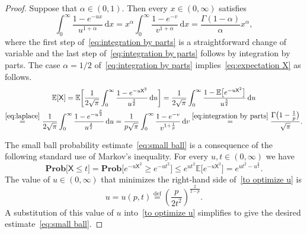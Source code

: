 \documentclass[11pt,reqno]{amsart}
\renewcommand{\le}{\leqslant}
\renewcommand{\ge}{\geqslant}
\newcommand{\ud}[0]{\,\mathrm{d}}
\theoremstyle{remark}
\newcommand{\E}{\mathbb{ E}}
\newcommand{\eqdef}{\stackrel{\mathrm{def}}{=}}
\renewcommand{\Pr}{\mathbf{Prob}}
\renewcommand{\1}{\mathbf 1}
\newcommand{\XX}{\mathsf{X}}
\begin{document}
\begin{proof}
Suppose that $\alpha\in (0,1)$. Then every $x\in (0,\infty)$ satisfies
\begin{equation}\label{eq:integration by parts}
\int_0^\infty \frac{1-e^{-ux}}{u^{1+\alpha}}\ud x =x^\alpha\int_0^\infty \frac{1-e^{-v}}{v^{1+\alpha}}\ud x= \frac{\Gamma(1-\alpha)}{\alpha}x^\alpha,
\end{equation}
where the first step of~\eqref{eq:integration by parts} is a straightforward change of variable and the last step of~\eqref{eq:integration by parts} follows by integration by parts.  The case $\alpha=1/2$ of~\eqref{eq:integration by parts} implies~\eqref{eq:expectation X} as follows.
\begin{multline*}
\E[\XX]=\E\bigg[\frac{1}{2\sqrt{\pi}}\int_0^\infty \frac{1-e^{-u\XX^2}}{u^{\frac{3}{2}}}\ud u\bigg]=\frac{1}{2\sqrt{\pi}}\int_0^\infty \frac{1-\E\big[e^{-u\XX^2}\big]}{u^{\frac{3}{2}}}\ud u\\\stackrel{\eqref{eq:laplace}}{=}\frac{1}{2\sqrt{\pi}}\int_0^\infty \frac{1-e^{-u^{\frac{p}{2}}}}{u^{\frac{3}{2}}}\ud u=\frac{1}{p\sqrt{\pi}}\int_0^\infty \frac{1-e^{-v}}{v^{1+\frac{1}{p}}}\ud v \stackrel{\eqref{eq:integration by parts}}{=}\frac{\Gamma\big(1-\frac{1}{p}\big)}{\sqrt{\pi}}.
\end{multline*}

The  small ball probability estimate~\eqref{eq:small ball} is a consequence of the following standard use of Markov's inequality. For every $u,t\in (0,\infty)$ we have
\begin{equation}\label{to optimize u}
\Pr\big[\XX\le t\big]=\Pr\Big[e^{-u\XX^2}\ge e^{-ut^2}\Big]\le e^{ut^2}\E\Big[e^{-u\XX^2}\Big]=e^{ut^2-u^{\frac{p}{2}}}.
\end{equation}
The value of $u\in (0,\infty)$ that minimizes the right-hand side of~\eqref{to optimize u} is
$$
u=u(p,t)\eqdef \left(\frac{p}{2t^2}\right)^{\frac{2}{2-p}}.
$$
A substitution of this value of $u$ into~\eqref{to optimize u} simplifies to give the desired estimate~\eqref{eq:small ball}.
\end{proof}
\end{document}
